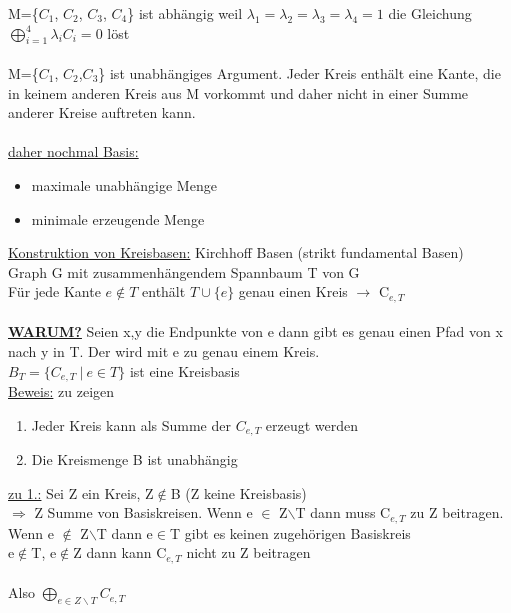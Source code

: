 M=\{$C_1$, $C_2$, $C_3$, $C_4$\} ist abhängig weil $\lambda_1=\lambda_2=\lambda_3=\lambda_4=1$ die Gleichung\\
$\bigoplus\limits_{i=1}^{4} \lambda_i C_i=0$ löst
\\\\
M=\{$C_1$, $C_2$,$C_3$\} ist unabhängiges Argument. Jeder Kreis enthält eine Kante, die in keinem anderen Kreis aus M vorkommt und daher nicht in einer Summe anderer Kreise auftreten kann.
\\\\
\underline{daher nochmal Basis:}
\begin{itemize}
	\item maximale unabhängige Menge
	\item minimale erzeugende Menge
\end{itemize}

\underline{Konstruktion von Kreisbasen:} Kirchhoff Basen (strikt fundamental Basen)
\\
Graph G mit zusammenhängendem Spannbaum T von G\\
Für jede Kante $e\notin T$ enthält $T \cup \{e\}$ genau einen Kreis $\rightarrow$ C$_{e,T}$
\\\\
\underline{\textbf{WARUM?}} Seien x,y die Endpunkte von e dann gibt es genau einen Pfad von x nach y in T. Der wird mit e zu genau einem Kreis.
\\
$B_T=\{C_{e,T}\ |\ e \in T\}$ ist eine Kreisbasis
\\
\underline{Beweis:} zu zeigen
\begin{enumerate}
	\item Jeder Kreis kann als Summe der $C_{e,T}$ erzeugt werden
	\item Die Kreismenge B ist unabhängig
\end{enumerate}

\underline{zu 1.:} Sei Z ein Kreis, Z$\notin$B (Z keine Kreisbasis)\\
$\Rightarrow$ Z Summe von Basiskreisen. Wenn e $\in$ Z$\backslash$T dann muss C$_{e,T}$ zu Z beitragen. Wenn e $\notin$ Z$\backslash$T dann e$\in$T gibt es keinen zugehörigen Basiskreis\\
e$\notin$T, e$\notin$Z dann kann C$_{e,T}$ nicht zu Z beitragen\\\\
Also $\bigoplus\limits_{e \in Z\backslash T} C_{e,T}$


